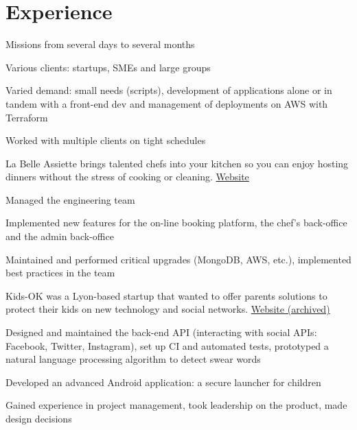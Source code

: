 \documentclass[
  english,
  a4paper
]{resume-openfont}
\begin{document}
\begin{minipage}[t]{0.66\textwidth}


\section{Experience}

%
\vspace{\topsep}
\begin{tightemize}
\item Missions from several days to several months
\item Various clients: startups, SMEs and large groups
\item Varied demand: small needs (scripts), development of applications alone or in tandem with a front-end dev and management of deployments on AWS with Terraform
\item Worked with multiple clients on tight schedules
\end{tightemize}
\sectionsep


%
%
La Belle Assiette brings talented chefs into your kitchen so you can enjoy hosting dinners without the stress of cooking or cleaning. \href{https://labelleassiette.co.uk}{Website}
\vspace{\topsep}
\begin{tightemize}
\item Managed the engineering team
\item Implemented new features for the on-line booking platform, the chef's back-office and the admin back-office
\item Maintained and performed critical upgrades (MongoDB, AWS, etc.), implemented best practices in the team
\end{tightemize}
\sectionsep

%
%
Kids-OK was a Lyon-based startup that wanted to offer parents solutions to protect their kids on new technology and social networks. \href{https://i.imgur.com/ZAXWuZN.png}{Website (archived)}
\vspace{\topsep}
\begin{tightemize}
\item Designed and maintained the back-end API (interacting with social APIs: Facebook, Twitter, Instagram), set up CI and automated tests, prototyped a natural language processing algorithm to detect swear words
\item Developed an advanced Android application: a secure launcher for children
\item Gained experience in project management, took leadership on the product, made design decisions
\end{tightemize}
\sectionsep


\end{minipage}
\end{document}
